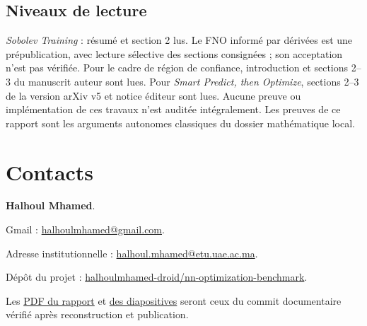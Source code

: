 \documentclass[11pt,a4paper]{article}
\begin{document}
\subsection*{Niveaux de lecture}
\emph{Sobolev Training} : résumé et section 2 lus.
Le FNO informé par dérivées est une prépublication, avec lecture sélective
des sections consignées ; son acceptation n'est pas vérifiée.
Pour le cadre de région de confiance, introduction et sections 2--3 du
manuscrit auteur sont lues. Pour \emph{Smart Predict, then Optimize},
sections 2--3 de la version arXiv v5 et notice éditeur sont lues.
Aucune preuve ou implémentation de ces travaux n'est auditée intégralement.
Les preuves de ce rapport sont les arguments autonomes classiques
du dossier mathématique local.


\section*{Contacts}
\textbf{Halhoul Mhamed}.\par
Gmail : \href{mailto:halhoulmhamed@gmail.com}{halhoulmhamed@gmail.com}.\par
Adresse institutionnelle :
\href{mailto:halhoul.mhamed@etu.uae.ac.ma}{halhoul.mhamed@etu.uae.ac.ma}.\par
Dépôt du projet : \href{https://github.com/halhoulmhamed-droid/nn-optimization-benchmark}{halhoulmhamed-droid/nn-optimization-benchmark}.\par
Les \href{https://github.com/halhoulmhamed-droid/nn-optimization-benchmark/blob/main/report/main.pdf}{PDF du rapport} et
\href{https://github.com/halhoulmhamed-droid/nn-optimization-benchmark/blob/main/slides/main.pdf}{des diapositives} seront ceux
du commit documentaire vérifié après reconstruction et publication.
\end{document}
